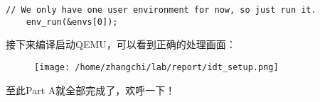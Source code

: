 \documentclass{article}
\begin{document}
\begin{CJK*}{UTF8}{gkai}
\begin{lstlisting}[style=ccode, firstnumber=44, title={\scriptsize \ttfamily \bfseries kern/init.c: i386\_init()}]
	// We only have one user environment for now, so just run it.
	env_run(&envs[0]);
\end{lstlisting}

接下来编译启动QEMU，可以看到正确的处理画面：


\begin{figure}[htp]
\centering
\texttt{[image: /home/zhangchi/lab/report/idt\_setup.png]}
\end{figure}

至此Part A就全部完成了，欢呼一下！

\begin{lstlisting}[style=console]
\end{lstlisting}

\begin{lstlisting}[style=console]
\end{lstlisting}








\begin{lstlisting}[style=ccode, title={\scriptsize \ttfamily \bfseries kern/env.c: env\_create()}]
\end{lstlisting}

\begin{lstlisting}[style=ccode, title={\scriptsize \ttfamily \bfseries kern/env.c: env\_create()}]
\end{lstlisting}

\begin{lstlisting}[style=ccode, title={\scriptsize \ttfamily \bfseries kern/env.c: env\_create()}]
\end{lstlisting}

\begin{lstlisting}[style=ccode, title={\scriptsize \ttfamily \bfseries kern/env.c: env\_create()}]
\end{lstlisting}





\begin{lstlisting}[style=exercise]
\end{lstlisting}

\begin{lstlisting}[style=exercise]
\end{lstlisting}

\begin{lstlisting}[style=exercise]
\end{lstlisting}






\end{CJK*}
\end{document}
